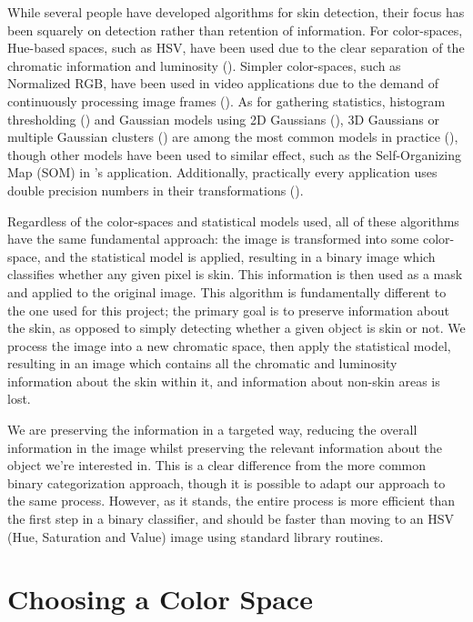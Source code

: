 While several people have developed algorithms for skin detection, their focus has been squarely on detection rather than retention of information. For color-spaces, Hue-based spaces, such as HSV, have been used due to the clear separation of the chromatic information and luminosity (\cite{Zarit1999a,Sigal2000a}). Simpler color-spaces, such as Normalized RGB, have been used in video applications due to the demand of continuously processing image frames (\cite{Soriano2000a}). As for gathering statistics, histogram thresholding (\cite{Soriano2000a,Sigal2000a}) and Gaussian models using 2D Gaussians (\cite{Terrillon1999a}), 3D Gaussians or multiple Gaussian clusters (\cite{Vezhnevets2003}) are among the most common models in practice (\cite{Shin2002a}), though other models have been used to similar effect, such as the Self-Organizing Map (SOM) in \cite{Brown2001a}'s application. Additionally, practically every application uses double precision numbers in their transformations (\cite{Shin2002a,Vezhnevets2003,Terrillon1999a}).

Regardless of the color-spaces and statistical models used, all of these algorithms have the same fundamental approach: the image is transformed into some color-space, and the statistical model is applied, resulting in a binary image which classifies whether any given pixel is skin. This information is then used as a mask and applied to the original image. This algorithm is fundamentally different to the one used for this project; the primary goal is to preserve information about the skin, as opposed to simply detecting whether a given object is skin or not. We process the image into a new chromatic space, then apply the statistical model, resulting in an image which contains all the chromatic and luminosity information about the skin within it, and information about non-skin areas is lost. 

We are preserving the information in a targeted way, reducing the overall information in the image whilst preserving the relevant information about the object we're interested in. This is a clear difference from the more common binary categorization approach, though it is possible to adapt our approach to the same process. However, as it stands, the entire process is more efficient than the first step in a binary classifier, and should be faster than moving to an HSV (Hue, Saturation and Value) image using standard library routines.


\section{Choosing a Color Space}

